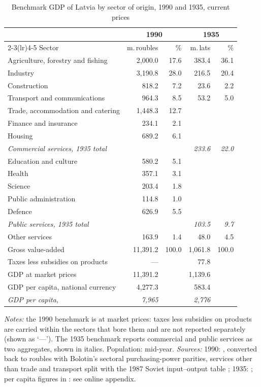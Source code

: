 \begin{table}[htbp]
\centering\small
\caption{Benchmark GDP of Latvia by sector of origin, 1990 and 1935, current prices}
\label{tab:benchmarks}
\begin{threeparttable}
\begin{tabular}{lrrrr}
\toprule
& \multicolumn{2}{c}{1990} & \multicolumn{2}{c}{1935} \\
\cmidrule(lr){2-3}\cmidrule(lr){4-5}
Sector & m.\,roubles & \% & m.\,lats & \% \\
\midrule
Agriculture, forestry and fishing & 2,000.0 & 17.6 & 383.4 & 36.1 \\
Industry & 3,190.8 & 28.0 & 216.5 & 20.4 \\
Construction & 818.2 & 7.2 & 23.6 & 2.2 \\
Transport and communications & 964.3 & 8.5 & 53.2 & 5.0 \\
Trade, accommodation and catering & 1,448.3 & 12.7 &  &  \\
Finance and insurance & 234.1 & 2.1 &  &  \\
Housing & 689.2 & 6.1 &  &  \\
\quad \textit{Commercial services, 1935 total} & & & \textit{233.6} & \textit{22.0} \\
Education and culture & 580.2 & 5.1 &  &  \\
Health & 357.1 & 3.1 &  &  \\
Science & 203.4 & 1.8 &  &  \\
Public administration & 114.8 & 1.0 &  &  \\
Defence & 626.9 & 5.5 &  &  \\
\quad \textit{Public services, 1935 total} & & & \textit{103.5} & \textit{9.7} \\
Other services & 163.9 & 1.4 & 48.0 & 4.5 \\
\midrule
Gross value-added & 11,391.2 & 100.0 & 1,061.8 & 100.0 \\
Taxes less subsidies on products & --- & & 77.8 & \\
GDP at market prices & 11,391.2 & & 1,139.6 & \\
GDP per capita, national currency & 4,277.3 & & 583.4 & \\
\textit{GDP per capita, \intlnineteen{}} & \textit{7,965} & & \textit{2,776} & \\
\bottomrule
\end{tabular}
\begin{tablenotes}
\footnotesize
\textit{Notes:} the 1990 benchmark is at market prices: taxes less subsidies on products are carried within the sectors that bore them and are not reported separately (shown as `---'). The 1935 benchmark reports commercial and public services as two aggregates, shown in italics. Population: mid-year. \textit{Sources:} 1990: \textcite[184--6]{bolotin1992}, converted back to roubles with Bolotin's sectoral purchasing-power parities, services other than trade and transport split with the 1987 Soviet input--output table \parencite{wbinputoutput1987}; 1935: \textcite[263--6, 287, 312]{norkuslatvia1935}; per capita figures in \intlnineteen{}: see online appendix.

\end{tablenotes}
\end{threeparttable}
\end{table}
